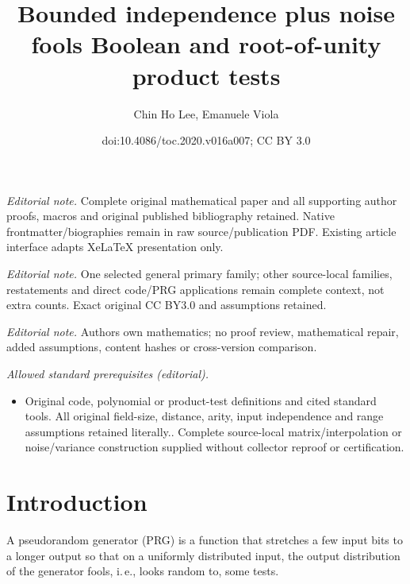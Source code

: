 \documentclass[11pt]{article}
\title{Bounded independence plus noise fools Boolean and root-of-unity product tests}
\author{Chin Ho Lee, Emanuele Viola}
\date{doi:10.4086/toc.2020.v016a007; CC BY 3.0}
\numberwithin{equation}{section}
\theoremstyle{definition}
\theoremstyle{plain}
\newcommand{\ie}{i.\,e.}
\begin{document}
\maketitle
\noindent\textit{Editorial note.} Complete original mathematical paper and all supporting author proofs, macros and original published bibliography retained. Native frontmatter/biographies remain in raw source/publication PDF. Existing article interface adapts XeLaTeX presentation only.\par\medskip
\noindent\textit{Editorial note.} One selected general primary family; other source-local families, restatements and direct code/PRG applications remain complete context, not extra counts. Exact original CC BY3.0 and assumptions retained.\par\medskip
\noindent\textit{Editorial note.} Authors own mathematics; no proof review, mathematical repair, added assumptions, content hashes or cross-version comparison.\par\medskip
\noindent\textit{Allowed standard prerequisites (editorial).}\begin{itemize}
\item Original code, polynomial or product-test definitions and cited standard tools. All original field-size, distance, arity, input independence and range assumptions retained literally.. Complete source-local matrix/interpolation or noise/variance construction supplied without collector reproof or certification.
\end{itemize}\medskip
\section{Introduction}

%
%
%
%
%
%

%
%
A pseudorandom generator (PRG) is a function that stretches a few input bits to a longer output so that on a uniformly distributed input, the output distribution of the generator fools, \ie, looks random to, some tests.
\end{document}
